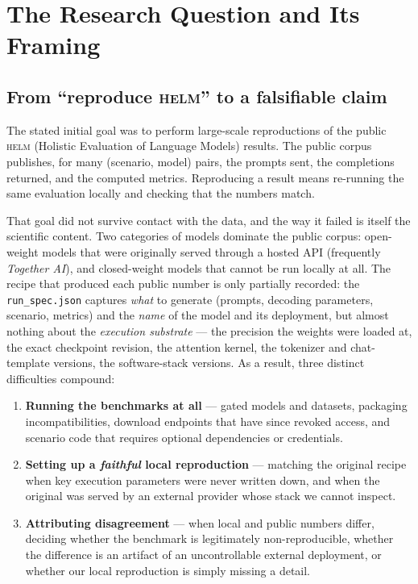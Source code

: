 \documentclass[11pt]{report}
\newcommand{\file}[1]{\texttt{#1}}
\begin{document}
\chapter{The Research Question and Its Framing}
\label{chap:framing}

\section{From ``reproduce \textsc{helm}'' to a falsifiable claim}

The stated initial goal was to perform large-scale reproductions of the public
\textsc{helm} (Holistic Evaluation of Language Models) results. The public
corpus publishes, for many (scenario, model) pairs, the prompts sent, the
completions returned, and the computed metrics. Reproducing a result means
re-running the same evaluation locally and checking that the numbers match.

That goal did not survive contact with the data, and the way it failed is itself
the scientific content. Two categories of models dominate the public corpus:
open-weight models that were originally served through a hosted API (frequently
\emph{Together AI}), and closed-weight models that cannot be run locally at all.
The recipe that produced each public number is only partially recorded: the
\file{run\_spec.json} captures \emph{what} to generate (prompts, decoding
parameters, scenario, metrics) and the \emph{name} of the model and its
deployment, but almost nothing about the \emph{execution substrate} --- the
precision the weights were loaded at, the exact checkpoint revision, the attention
kernel, the tokenizer and chat-template versions, the software-stack versions. As
a result, three distinct difficulties compound:

\begin{enumerate}[nosep]
  \item \textbf{Running the benchmarks at all} --- gated models and datasets,
        packaging incompatibilities, download endpoints that have since revoked
        access, and scenario code that requires optional dependencies or
        credentials.
  \item \textbf{Setting up a \emph{faithful} local reproduction} --- matching the
        original recipe when key execution parameters were never written down, and
        when the original was served by an external provider whose stack we cannot
        inspect.
  \item \textbf{Attributing disagreement} --- when local and public numbers
        differ, deciding whether the benchmark is legitimately non-reproducible,
        whether the difference is an artifact of an uncontrollable external
        deployment, or whether our local reproduction is simply missing a detail.
\end{enumerate}
\end{document}
